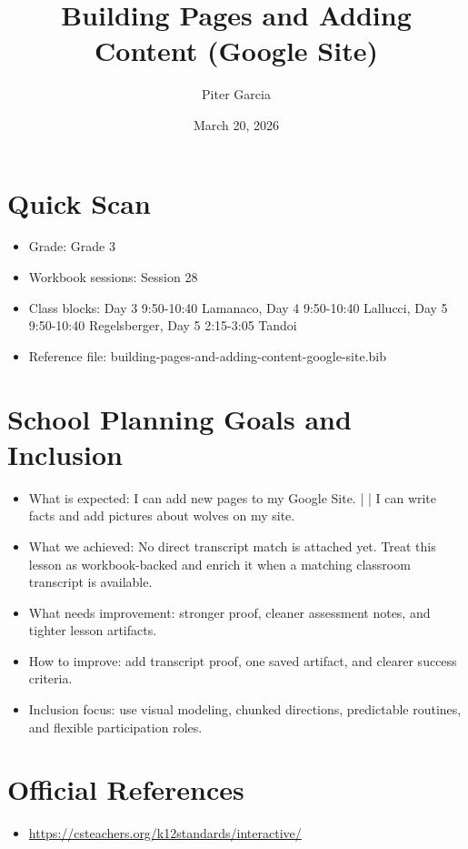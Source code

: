 \documentclass[11pt]{article}
\title{Building Pages and Adding Content (Google Site)}
\author{Piter Garcia}
\date{March 20, 2026}
\begin{document}
\maketitle
\section*{Quick Scan}
\begin{itemize}[leftmargin=*]
\item Grade: Grade 3
\item Workbook sessions: Session 28
\item Class blocks: Day 3 9:50-10:40 Lamanaco, Day 4 9:50-10:40 Lallucci, Day 5 9:50-10:40 Regelsberger, Day 5 2:15-3:05 Tandoi
\item Reference file: building-pages-and-adding-content-google-site.bib
\end{itemize}
\section*{School Planning Goals and Inclusion}
\begin{itemize}[leftmargin=*]
\item What is expected: I can add new pages to my Google Site. | | I can write facts and add pictures about wolves on my site.
\item What we achieved: No direct transcript match is attached yet. Treat this lesson as workbook-backed and enrich it when a matching classroom transcript is available.
\item What needs improvement: stronger proof, cleaner assessment notes, and tighter lesson artifacts.
\item How to improve: add transcript proof, one saved artifact, and clearer success criteria.
\item Inclusion focus: use visual modeling, chunked directions, predictable routines, and flexible participation roles.
\end{itemize}
\section*{Official References}
\begin{itemize}[leftmargin=*]
\item \url{https://csteachers.org/k12standards/interactive/}

\end{itemize}
\end{document}
